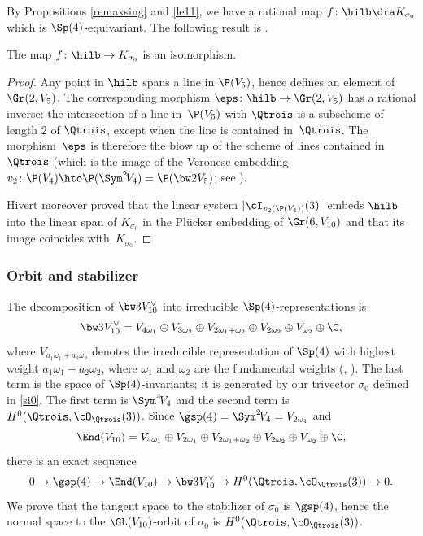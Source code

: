 By Propositions \ref{remaxsing} and \ref{le11}, we have
a
rational map $f\colon \hilb\dra K_{\sigma_0}$ which is $\Sp(4)$-equivariant. The following result is \cite[Th.\,6.3]{hivert}.

\begin{theo}[Hivert] \label{thoehivertDVtzero}
The map $f\colon \hilb\to K_{\sigma_0}$ is an isomorphism.
\end{theo}

\begin{proof}
Any point in $\hilb$ spans a line in $\P(V_5)$, hence defines an element of $\Gr(2,V_5)$. The corresponding morphism $\eps\colon\hilb\to \Gr(2,V_5)$ has a rational inverse: the intersection of a line in~$\P(V_5)$ with $\Qtrois$ is a subscheme of length $2$ of $\Qtrois$, except when
the line is
contained in~$\Qtrois$. The morphism~$\eps$ is therefore the blow up of the scheme of lines contained in~$\Qtrois$ (which is the
image of the Veronese embedding
$v_2\colon \P(V_4)\hto \P(\Sym^2\!V_4)=\P(\bw2V_5)
$; see \cite[\S 6.2]{hivert}).

Hivert moreover proved that the linear system $|\cI_{v_2(\P(V_4) )}(3)|$ embeds $\hilb$ into
the linear
span of $K_{\sigma_0}$ in the Plücker embedding of $\Gr(6,V_{10} )$ and that
its image coincides with~$K_{\sigma_0}$.
\end{proof}

\subsubsection{Orbit and stabilizer}\label{orbetstab}

The decomposition of $\bw3V_{10}^\vee$ into irreducible $\Sp(4)$-representations
is
\begin{equation} \label{eqhivert}
\bw3V_{10}^\vee=V_{4\omega_1}\oplus V_{3\omega_2}\oplus V_{2\omega_1+\omega_2}\oplus V_{2\omega_2}\oplus V_{\omega_2}\oplus \C,
\end{equation}
where $V_{a_1\omega_1+a_2\omega_2}$ denotes the irreducible representation of $\Sp(4)$ with highest weight $a_1\omega_1+a_2\omega_2$, where $\omega_1$ and $\omega_2$ are the fundamental weights (\cite[\S 6.2]{hivert}, \cite{bbki}).
The last term is the space of $\Sp(4)$-invariants; it is generated by our trivector
$\sigma_0$ defined in \eqref{si0}.
The first term is $ \Sym^4\!V_4$ and the second term is $ H^0(\Qtrois,\cO_{\Qtrois}(3))$. Since $\gsp (4)=\Sym^2\!V_4=V_{2\omega_1}$ and
\[
\End(V_{10})=V_{4\omega_1}\oplus V_{2\omega_1}\oplus V_{2\omega_1+\omega_2}\oplus V_{2\omega_2}\oplus V_{\omega_2}\oplus \C
,
\] there is an exact sequence
\[
0\to \gsp (4)\to \End(V_{10})\to \bw3V_{10}^\vee \to H^0(\Qtrois,\cO_{\Qtrois}(3))\to 0.
\]
We prove that the tangent space to the stabilizer of $\sigma_0$ is $\gsp (4)$, hence the normal
space to the $\GL(V_{10})$-orbit of $\sigma_0$
is
$ H^0(\Qtrois,\cO_{\Qtrois}(3))$.

